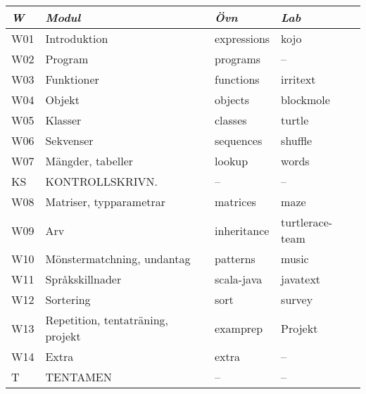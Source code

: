 \begin{tabular}{l|l|l|l}
\textit{W} & \textit{Modul} & \textit{Övn} & \textit{Lab} \\ \hline \hline
W01 & Introduktion & expressions & kojo \\
W02 & Program & programs & -- \\
W03 & Funktioner & functions & irritext \\
W04 & Objekt & objects & blockmole \\
W05 & Klasser & classes & turtle \\
W06 & Sekvenser & sequences & shuffle \\
W07 & Mängder, tabeller & lookup & words \\
KS & KONTROLLSKRIVN. & -- & -- \\
W08 & Matriser, typparametrar & matrices & maze \\
W09 & Arv & inheritance & turtlerace-team \\
W10 & Mönstermatchning, undantag & patterns & music \\
W11 & Språkskillnader & scala-java & javatext \\
W12 & Sortering & sort & survey \\
W13 & Repetition, tentaträning, projekt & examprep & Projekt \\
W14 & Extra & extra & -- \\
T & TENTAMEN & -- & -- \\
\end{tabular}
